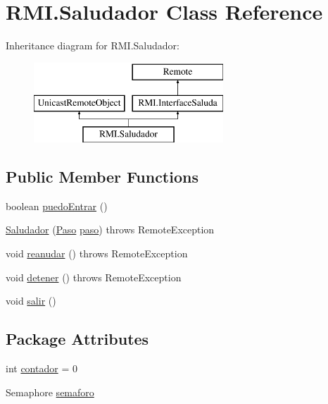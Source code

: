 \hypertarget{class_r_m_i_1_1_saludador}{}\section{R\+M\+I.\+Saludador Class Reference}
\label{class_r_m_i_1_1_saludador}
Inheritance diagram for R\+M\+I.\+Saludador\+:\begin{figure}[H]
\begin{center}
\leavevmode
\includegraphics[height=3.000000cm]{class_r_m_i_1_1_saludador}
\end{center}
\end{figure}
\subsection*{Public Member Functions}
\begin{DoxyCompactItemize}
\item 
boolean \mbox{\hyperlink{class_r_m_i_1_1_saludador_a1fc26b10a1968a3d7080adf3acf37718}{puedo\+Entrar}} ()
\item 
\mbox{\hyperlink{class_r_m_i_1_1_saludador_a142d4fff5a3506d069b4a80a9e571de0}{Saludador}} (\mbox{\hyperlink{class_r_m_i_1_1_paso}{Paso}} \mbox{\hyperlink{class_r_m_i_1_1_saludador_acf8f2452f97fd371135558ba37283fa4}{paso}})  throws Remote\+Exception           
\item 
void \mbox{\hyperlink{class_r_m_i_1_1_saludador_af163fac056a4927e199c43262d3f3b05}{reanudar}} ()  throws Remote\+Exception       
\item 
void \mbox{\hyperlink{class_r_m_i_1_1_saludador_a0d92560cbe25dfcfc18c73dfd3295fa4}{detener}} ()  throws Remote\+Exception     
\item 
void \mbox{\hyperlink{class_r_m_i_1_1_saludador_af05a48b9f5aaacd7c3cefcf12e9c1969}{salir}} ()
\end{DoxyCompactItemize}
\subsection*{Package Attributes}
\begin{DoxyCompactItemize}
\item 
int \mbox{\hyperlink{class_r_m_i_1_1_saludador_aee589ef80147254fc33e2b73d5f8ca2b}{contador}} = 0
\item 
Semaphore \mbox{\hyperlink{class_r_m_i_1_1_saludador_a772baa4676a1aa111b792ebd3d77cfcd}{semaforo}}
\end{DoxyCompactItemize}
